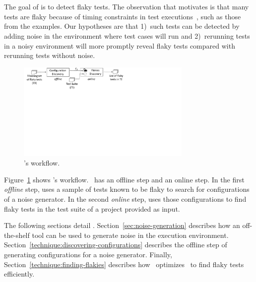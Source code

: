 \documentclass[conference]{IEEEtran}
\begin{document}

\section{\tname{}}
\label{sec:approach}


\sloppy
The goal of \tname{} is to detect flaky tests. The observation that motivates \tname{} is that many tests are flaky because of timing constraints in test executions~\cite{Luo:2014:EAF:2635868.2635920,thorve2018empirical,dong2020concurrencyrelated}, such as those from the examples. Our hypotheses are that 1)~such tests can be detected by adding noise in the environment where test cases will run and 2)~rerunning tests in a noisy environment will more promptly reveal flaky tests compared with rerunning tests without noise.

\begin{figure}[h]
    \centering
    \includegraphics[trim=0 400 0 0,clip,width=0.75\textwidth]{figs/shaker.pdf}
    \caption{\tname's workflow.}
    \label{fig:workflow}
\end{figure}

Figure~\ref{fig:workflow} shows \tname{}'s workflow. \tname\ has an offline step and an online step. In the first \emph{offline} step, \tname{} uses a sample of tests known to be flaky to search for configurations of a noise generator. In the second \emph{online} step, \tname{} uses those configurations to find flaky tests in the test suite of a project provided as input. 

The following sections detail \tname. Section~\ref{sec:noise-generation} describes how an off-the-shelf tool can be used to generate noise in the execution environment. Section~\ref{technique:discovering-configurations} describes the offline step of generating configurations for a noise generator. Finally, Section~\ref{technique:finding-flakies} describes how \tname\ optimizes \rerun\ to find flaky tests efficiently.
\end{document}
